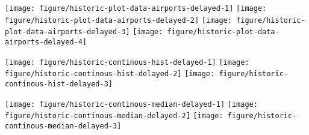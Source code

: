 \documentclass{article}\usepackage[]{graphicx}\usepackage[]{color}
\newenvironment{knitrout}{}{} %
\begin{document}
\begin{landscape}
\begin{knitrout}
\color{fgcolor}

{\centering \texttt{[image: figure/historic-plot-data-airports-delayed-1]} 
\texttt{[image: figure/historic-plot-data-airports-delayed-2]} 
\texttt{[image: figure/historic-plot-data-airports-delayed-3]} 
\texttt{[image: figure/historic-plot-data-airports-delayed-4]} 

}



\end{knitrout}
\vspace{3 mm}



\begin{knitrout}
\color{fgcolor}

{\centering \texttt{[image: figure/historic-continous-hist-delayed-1]} 
\texttt{[image: figure/historic-continous-hist-delayed-2]} 
\texttt{[image: figure/historic-continous-hist-delayed-3]} 

}



\end{knitrout}
\vspace{2 mm}

\begin{knitrout}
\color{fgcolor}

{\centering \texttt{[image: figure/historic-continous-median-delayed-1]} 
\texttt{[image: figure/historic-continous-median-delayed-2]} 
\texttt{[image: figure/historic-continous-median-delayed-3]} 

}



\end{knitrout}
\end{landscape}
\end{document}
